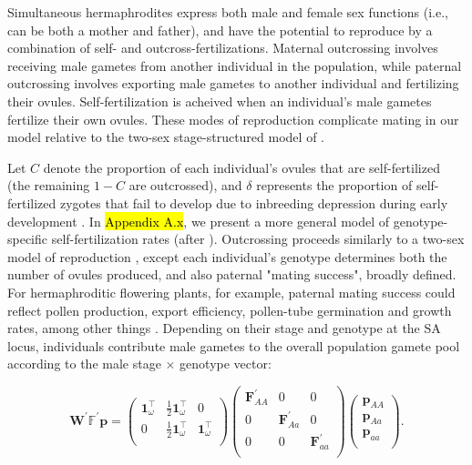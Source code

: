 \documentclass[11pt]{article}
\def\mbf#1{\mathbf{#1}}
\def\mbb#1{\mathbb{#1}}
\begin{document}
Simultaneous hermaphrodites express both male and female sex functions (i.e., can be both a mother and father), and have the potential to reproduce by a combination of self- and outcross-fertilizations. Maternal outcrossing involves receiving male gametes from another individual in the population, while paternal outcrossing involves exporting male gametes to another individual and fertilizing their ovules. Self-fertilization is acheived when an individual's male gametes fertilize their own ovules. These modes of reproduction complicate mating in our model relative to the two-sex stage-structured model of \citet{deVriesCaswell2019b}.

Let $C$ denote the proportion of each individual's ovules that are self-fertilized (the remaining $1 - C$ are outcrossed), and $\delta$ represents the proportion of self-fertilized zygotes that fail to develop due to inbreeding depression during early development \citep{Charlesworth1987}. In \hl{Appendix A.x}, we present a more general model of genotype-specific self-fertilization rates (after \citealt{JordanConnallon2014}). Outcrossing proceeds similarly to a two-sex model of reproduction \citep{deVriesCaswell2019b}, except each individual's genotype determines both the number of ovules produced, and also paternal "mating success", broadly defined. For hermaphroditic flowering plants, for example, paternal mating success could reflect pollen production, export efficiency, pollen-tube germination and growth rates, among other things \citep{LloydWebb1986,WangBarrett2020,Harder2016}. Depending on their stage and genotype at the SA locus, individuals contribute male gametes to the overall population gamete pool according to the male stage $\times$ genotype vector:
\begin{linenomath*}
\begin{equation}
		\mbf{W}^{\prime} \mbb{F}^{\prime} \mbf{p} = 
		\left(
			\begin{array}{ccc}
				\mbf{1}^{\intercal}_{\omega} & \frac{1}{2} \mbf{1}^{\intercal}_{\omega} & 0 \\
				0 & \frac{1}{2} \mbf{1}^{\intercal}_{\omega} & \mbf{1}^{\intercal}_{\omega} \\
			\end{array} \right)
		\left(
			\begin{array}{ccc}
				\mbf{F}^{\prime}_{AA} & 0 & 0 \\
				0 & \mbf{F}^{\prime}_{Aa} & 0 \\
				0 & 0 & \mbf{F}^{\prime}_{aa} \\
			\end{array} \right)
		\left(
			\begin{array}{c}
				\mbf{p}_{AA} \\
				\mbf{p}_{Aa} \\
				\mbf{p}_{aa} \\
			\end{array} \right).
\end{equation}
\end{linenomath*}
\end{document}
